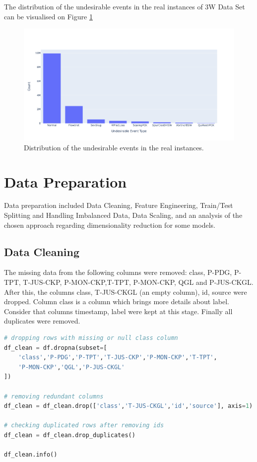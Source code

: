 \documentclass{article}
\begin{document}
The distribution of the undesirable events in the real instances of 3W Data Set can be visualised on Figure \ref{fig:undesirable_event_distr}

\begin{figure}
\centering
\includegraphics[width=1\textwidth]{undesirable_event_distr.png}
\caption{\label{fig:undesirable_event_distr}Distribution of the undesirable events in the real instances.}
\end{figure}


\section{Data Preparation}

Data preparation included Data Cleaning, Feature Engineering, Train/Test Splitting and Handling Imbalanced Data, Data Scaling, and an analysis of the chosen approach regarding dimensionality reduction for some models.

\subsection{Data Cleaning}

The missing data from the following columns were removed: class, P-PDG, P-TPT, T-JUS-CKP, P-MON-CKP,T-TPT, P-MON-CKP, QGL and P-JUS-CKGL. After this, the columns class, T-JUS-CKGL (an empty column), id, source were dropped. Column class is a column which brings more details about label. Consider that columns timestamp, label were kept at this stage. Finally all duplicates were removed. 

\begin{lstlisting}[language=Python]
# dropping rows with missing or null class column
df_clean = df.dropna(subset=[
    'class','P-PDG','P-TPT','T-JUS-CKP','P-MON-CKP','T-TPT',
    'P-MON-CKP','QGL','P-JUS-CKGL'
])

# removing redundant columns
df_clean = df_clean.drop(['class','T-JUS-CKGL','id','source'], axis=1)

# checking duplicated rows after removing ids
df_clean = df_clean.drop_duplicates()

df_clean.info()
\end{lstlisting}
\end{document}
